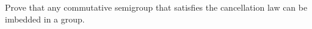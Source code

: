 Prove that any commutative semigroup that satisfies the cancellation law can be imbedded in a group.

